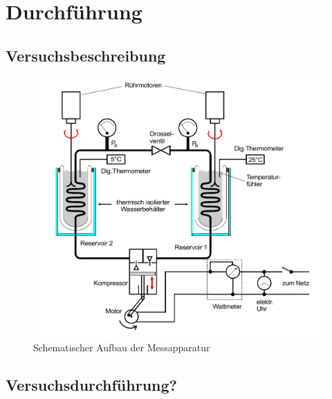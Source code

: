 \section{Durchführung}
\label{sec:Durchführung}



\subsection{Versuchsbeschreibung}
\label{sec:Versuchsbeschreibung}
\begin{figure}
  \centering
  \includegraphics[width=\textwidth]{content/messapparatur.png}
  \caption{Schematischer Aufbau der Messapparatur \cite{Anleitung}}
  \label{fig:bild2}
\end{figure}

\subsection{Versuchsdurchführung?}
